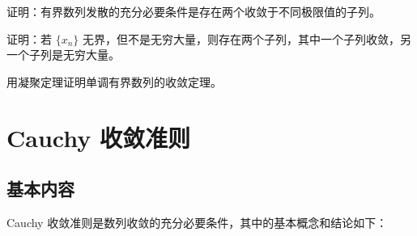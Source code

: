 \begin{xexercise}[2]
证明：有界数列发散的充分必要条件是存在两个收敛于不同极限值的子列。
\end{xexercise}

\begin{xexercise}[3]
证明：若 $\{x_n\}$ 无界，但不是无穷大量，则存在两个子列，其中一个子列收敛，另一个子列是无穷大量。
\end{xexercise}

\begin{xexercise}[4]
用凝聚定理证明单调有界数列的收敛定理。
\end{xexercise}

\section{Cauchy 收敛准则}

\subsection{基本内容}

Cauchy 收敛准则是数列收敛的充分必要条件，其中的基本概念和结论如下：

